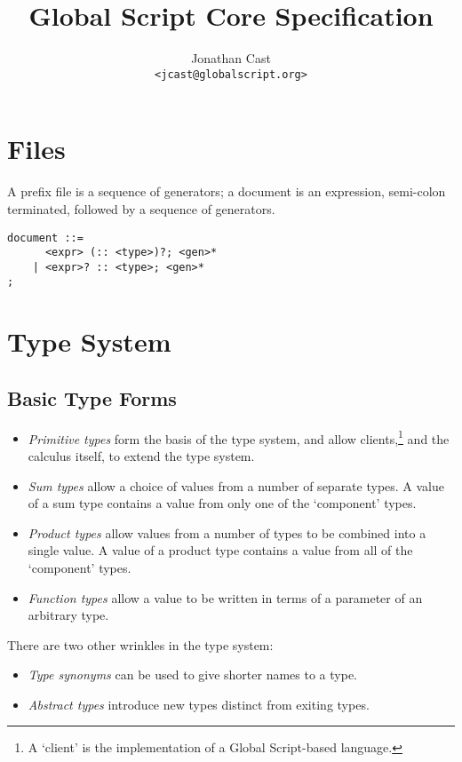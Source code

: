 \documentclass{article}
\title{Global Script Core Specification}
\author{Jonathan Cast\\\texttt{<jcast@globalscript.org>}}
\newcommand\defn[1]{\emph{#1}}
\begin{document}
\maketitle

\tableofcontents

\section{Files}

A prefix file is a sequence of generators; a document is an expression, semi-colon terminated, followed by a sequence of generators.

\begin{verbatim}
document ::=
      <expr> (:: <type>)?; <gen>*
    | <expr>? :: <type>; <gen>*
;
\end{verbatim}

\section{Type System}

\subsection{Basic Type Forms}

\begin{itemize}
    \item \defn{Primitive types} form the basis of the type system, and
    allow clients,\footnote{A `client' is the implementation of a Global Script-based language.}
    and the calculus itself,
    to extend the type system.

    \item \defn{Sum types} allow a choice of values from a number of separate types.
        A value of a sum type contains a value from only one of the `component' types.

    \item \defn{Product types} allow values from a number of types to be combined into a single value.
        A value of a product type contains a value from all of the `component' types.

    \item \defn{Function types} allow a value to be written in terms of a parameter of an arbitrary type.
\end{itemize}

There are two other wrinkles in the type system:
\begin{itemize}
    \item \defn{Type synonyms} can be used to give shorter names to a type.

    \item \defn{Abstract types} introduce new types distinct from exiting types.
\end{itemize}
\end{document}
